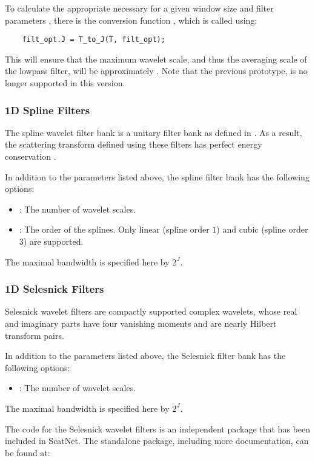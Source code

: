 \documentclass{article}
\begin{document}
To calculate the appropriate  necessary for a given window size  and filter parameters , there is the conversion function , which is called using:
\begin{lstlisting}
	filt_opt.J = T_to_J(T, filt_opt);
\end{lstlisting}
This will ensure that the maximum wavelet scale, and thus the averaging scale of the lowpass filter, will be approximately . Note that the previous prototype,  is no longer supported in this version.

\subsubsection{1D Spline Filters}
The spline wavelet filter bank is a unitary filter bank as defined in \cite{mallatbook}. As a result, the scattering transform defined using these filters has perfect energy conservation \cite{stephane}.

In addition to the parameters listed above, the spline filter bank has the following options:
\begin{itemize}
	\item {}: The number of wavelet scales.
	\item {}: The order of the splines. Only linear (spline order $1$) and cubic (spline order $3$) are supported.
\end{itemize}
The maximal bandwidth is specified here by $2^J$.

\subsubsection{1D Selesnick Filters}
Selesnick wavelet filters are compactly supported complex wavelets, whose real and imaginary parts have four vanishing moments and are nearly Hilbert transform pairs.

In addition to the parameters listed above, the Selesnick filter bank has the following options:
\begin{itemize}
  \item {}: The number of wavelet scales.
\end{itemize}
The maximal bandwidth is specified here by $2^J$.

The code for the Selesnick wavelet filters is an independent package that has been included in ScatNet. The standalone package, including more documentation, can be found at:
\end{document}
